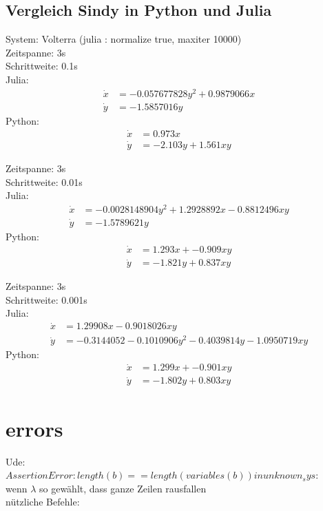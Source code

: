 \documentclass[arbeit=studie,oneside,BCOR=12mm]{ArbeitRST}
\begin{document}
\subsection{Vergleich Sindy in Python und Julia}
System: Volterra (julia : normalize true, maxiter 10000)\\
Zeitspanne: 3s\\
Schrittweite: 0.1s\\
Julia:\\
\begin{align*}
\dot{x} &= -0.057677828 y^2 + 0.9879066 x\\
\dot{y} &= -1.5857016 y
\end{align*}
Python:\\
\begin{align*}
\dot{x} &= 0.973 x\\
\dot{y} &= -2.103 y + 1.561 xy
\end{align*}

Zeitspanne: 3s\\
Schrittweite: 0.01s\\
Julia:\\
\begin{align*}
\dot{x} &= -0.0028148904 y^2 + 1.2928892 x - 0.8812496 xy\\
\dot{y} &= -1.5789621 y
\end{align*}
Python:\\
\begin{align*}
\dot{x} &= 1.293 x + -0.909 xy\\
\dot{y} &= -1.821 y + 0.837 xy
\end{align*}

Zeitspanne: 3s\\
Schrittweite: 0.001s\\
Julia:\\
\begin{align*}
\dot{x} &= 1.29908 x -0.9018026 xy\\
\dot{y} &= -0.3144052 -0.1010906 y^2 -0.4039814 y -1.0950719 xy
\end{align*}
Python:\\
\begin{align*}
\dot{x} &= 1.299 x + -0.901 x y\\
\dot{y} &= -1.802 y + 0.803 x y
\end{align*}

\section{errors}
Ude:\\
$AssertionError: length(b) == length(variables(b)) in unknown_sys:$\\
wenn $\lambda$ so gewählt, dass ganze Zeilen rausfallen\\
nützliche Befehle: %

\nocite{Mik57de}

\printbibliography
\end{document}
